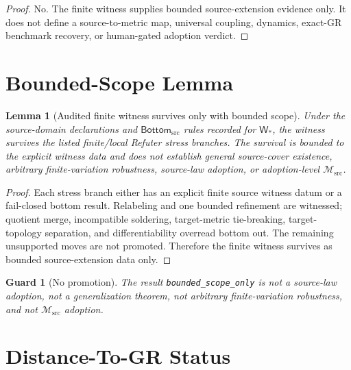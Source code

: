 \documentclass[11pt]{article}
\newcommand{\Msrc}{\mathcal{M}_{\mathrm{src}}}
\newcommand{\BottomSrc}{\mathsf{Bottom}_{\mathrm{src}}}
\newtheorem{lemma}{Lemma}
\newtheorem{guard}{Guard}
\begin{document}
\begin{proof}
No. The finite witness supplies bounded source-extension evidence only. It
does not define a source-to-metric map, universal coupling, dynamics, exact-GR
benchmark recovery, or human-gated adoption verdict.
\end{proof}

\section{Bounded-Scope Lemma}

\begin{lemma}[Audited finite witness survives only with bounded scope]
Under the source-domain declarations and \(\BottomSrc\) rules recorded for
\(\mathsf{W}_*\), the witness survives the listed finite/local Refuter stress
branches. The survival is bounded to the explicit witness data and does not
establish general source-cover existence, arbitrary finite-variation
robustness, source-law adoption, or adoption-level \(\Msrc\).
\end{lemma}

\begin{proof}
Each stress branch either has an explicit finite source witness datum or a
fail-closed bottom result. Relabeling and one bounded refinement are witnessed;
quotient merge, incompatible soldering, target-metric tie-breaking,
target-topology separation, and differentiability overread bottom out. The
remaining unsupported moves are not promoted. Therefore the finite witness
survives as bounded source-extension data only.
\end{proof}

\begin{guard}[No promotion]
The result \texttt{bounded\_scope\_only} is not a source-law adoption, not a
generalization theorem, not arbitrary finite-variation robustness, and not
\(\Msrc\) adoption.
\end{guard}

\section{Distance-To-GR Status}
\end{document}
